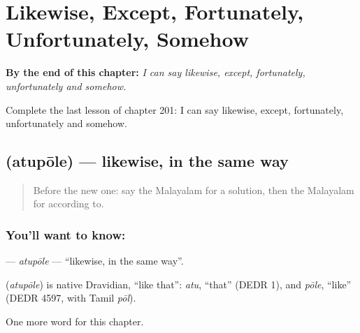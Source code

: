 
\chapter{Likewise, Except, Fortunately, Unfortunately, Somehow}
\label{ch:ml-likewise-except-fortunately-unfortunately-somehow}

\begin{chapteropening}
\textbf{By the end of this chapter:} \emph{I can say likewise, except, fortunately, unfortunately and somehow.}

Complete the last lesson of chapter 201: I can say likewise, except, fortunately, unfortunately and somehow.
\end{chapteropening}

\section[\texorpdfstring{\ml{അതുപോലെ} (atupōle)}{അതുപോലെ (atupōle)}]{ (atupōle) — likewise, in the same way}

\label{lesson:ML-C201-atupole}



\begin{quote}
Before the new one: say the Malayalam for a solution, then the Malayalam for according to.
\end{quote}

\subsection*{You'll want to know: }
\textbf{} — \emph{atupōle} — \textquotedblleft{}likewise, in the same way\textquotedblright{}.

\begin{cousinweb}
\textbf{} (\emph{atupōle}) is native Dravidian, \textquotedblleft{}like that\textquotedblright{}: \emph{atu}, \textquotedblleft{}that\textquotedblright{} (DEDR 1), and \emph{pōle}, \textquotedblleft{}like\textquotedblright{} (DEDR 4597, with Tamil \emph{pōl}).
\end{cousinweb}

\begin{grammarlens}[title={What you've built}]
One more word for this chapter.
\end{grammarlens}


